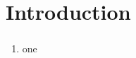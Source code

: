 \section{Introduction}


\begin{frame}
\frametitle{}

\end{frame}

\begin{frame}
\frametitle{}

\begin{enumerate}
\item one
\end{enumerate}

\end{frame}

\begin{frame}
\frametitle{}

\end{frame}

